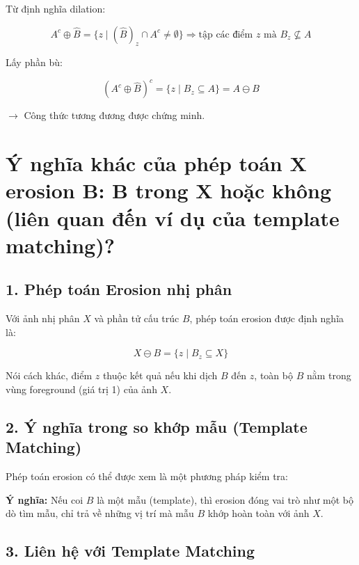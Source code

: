 \documentclass[12pt]{article}
\begin{document}
	Từ định nghĩa dilation:
	
	\[
	A^c \oplus \hat{B} = \{ z \mid (\hat{B})_z \cap A^c \neq \emptyset \}
	\Rightarrow \text{tập các điểm } z \text{ mà } B_z \not\subseteq A
	\]
	
	Lấy phần bù:
	
	\[
	\left( A^c \oplus \hat{B} \right)^c = \{ z \mid B_z \subseteq A \} = A \ominus B
	\]
	
	 $\rightarrow$ Công thức tương đương được chứng minh.
	 
	 \section{Ý nghĩa khác của phép toán X erosion B: B trong X hoặc không (liên quan đến ví dụ của template matching)?}
	 
	 \subsection*{1. Phép toán Erosion nhị phân}
	 
	 Với ảnh nhị phân $X$ và phần tử cấu trúc $B$, phép toán erosion được định nghĩa là:
	 
	 \[
	 X \ominus B = \{ z \mid B_z \subseteq X \}
	 \]
	 
	 Nói cách khác, điểm $z$ thuộc kết quả nếu khi dịch $B$ đến $z$, toàn bộ $B$ nằm trong vùng foreground (giá trị 1) của ảnh $X$.
	 
	 \subsection*{2. Ý nghĩa trong so khớp mẫu (Template Matching)}
	 
	 Phép toán erosion có thể được xem là một phương pháp kiểm tra:
	 
	 \begin{center}
	 \end{center}
	 
	 \textbf{Ý nghĩa:} Nếu coi $B$ là một mẫu (template), thì erosion đóng vai trò như một bộ dò tìm mẫu, chỉ trả về những vị trí mà mẫu $B$ khớp hoàn toàn với ảnh $X$.
	 
	 \subsection*{3. Liên hệ với Template Matching}
	 
\end{document}

